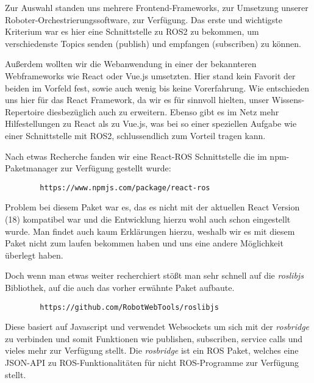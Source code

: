 \begin{flushleft}


    
    Zur Auswahl standen uns mehrere Frontend-Frameworks, zur Umsetzung unserer Roboter-Orchestrierungssoftware, zur Verfügung. Das erste und wichtigste Kriterium war es hier eine Schnittstelle zu ROS2 zu bekommen, um verschiedenste Topics senden (publish) und empfangen (subscriben) zu können. 

    Außerdem wollten wir die Webanwendung in einer der bekannteren Webframeworks wie React oder Vue.js umsetzten. Hier stand kein Favorit der beiden im Vorfeld fest, sowie auch wenig bis keine Vorerfahrung. Wie entschieden uns hier für das React Framework, da wir es für sinnvoll hielten, unser Wissens-Repertoire diesbezüglich auch zu erweitern. Ebenso gibt es im Netz mehr Hilfestellungen zu React als zu Vue.js, was bei so einer speziellen Aufgabe wie einer Schnittstelle mit ROS2, schlussendlich zum Vorteil tragen kann. 

    Nach etwas Recherche fanden wir eine React-ROS Schnittstelle die im npm-Paketmanager zur Verfügung gestellt wurde:
    \begin{lstlisting}
        https://www.npmjs.com/package/react-ros 
    \end{lstlisting}

    Problem bei diesem Paket war es, das es nicht mit der aktuellen React Version (18) kompatibel war und die Entwicklung hierzu wohl auch schon eingestellt wurde. Man findet auch kaum Erklärungen hierzu, weshalb wir es mit diesem Paket nicht zum laufen bekommen haben und uns eine andere Möglichkeit überlegt haben.

    Doch wenn man etwas weiter recherchiert stößt man sehr schnell auf die \textit{roslibjs} Bibliothek, auf die auch das vorher erwähnte Paket aufbaute. 
    \begin{lstlisting}
        https://github.com/RobotWebTools/roslibjs 
    \end{lstlisting}
    
    Diese basiert auf Javascript und verwendet Websockets um sich mit der \textit{rosbridge} zu verbinden und somit Funktionen wie publishen, subscriben, service calls und vieles mehr zur Verfügung stellt. Die \textit{rosbridge} ist ein ROS Paket, welches eine JSON-API zu ROS-Funktionalitäten für nicht ROS-Programme zur Verfügung stellt.


\end{flushleft}
